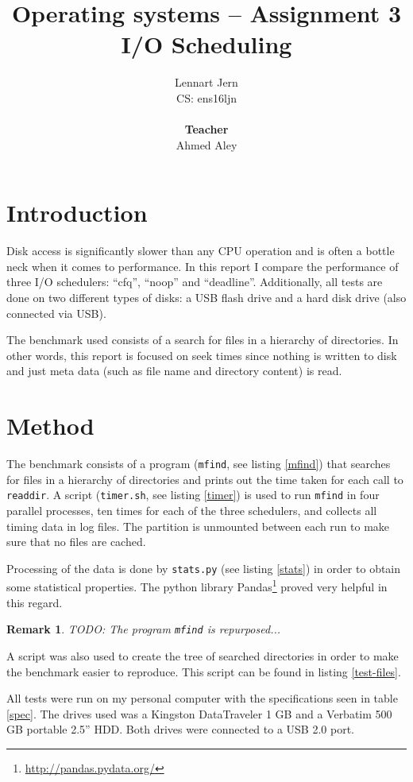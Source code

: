 \documentclass[12pt, a4paper]{article} %
\title{Operating systems -- Assignment 3\\I/O Scheduling}
\author{Lennart Jern\\
	CS: ens16ljn\\ \\ \textbf{Teacher}\\ Ahmed Aley}
\newtheorem{remark}{Remark}
\begin{document}
\maketitle

\newpage


\section{Introduction}

Disk access is significantly slower than any CPU operation and is often a bottle neck when it comes to performance.
In this report I compare the performance of three I/O schedulers: ``cfq'', ``noop'' and ``deadline''.
Additionally, all tests are done on two different types of disks: a USB flash drive and a hard disk drive (also connected via USB).

The benchmark used consists of a search for files in a hierarchy of directories.
In other words, this report is focused on seek times since nothing is written to disk and just meta data (such as file name and directory content) is read.

\section{Method}

The benchmark consists of a program (\texttt{mfind}, see listing \ref{mfind}) that searches for files in a hierarchy of directories and prints out the time taken for each call to \texttt{readdir}.
A script (\texttt{timer.sh}, see listing \ref{timer}) is used to run \texttt{mfind} in four parallel processes, ten times for each of the three schedulers, and collects all timing data in log files.
The partition is unmounted between each run to make sure that no files are cached.

Processing of the data is done by \texttt{stats.py} (see listing \ref{stats}) in order to obtain some statistical properties.
The python library Pandas\footnote{\url{http://pandas.pydata.org/}} proved very helpful in this regard.

\begin{remark}
	TODO: The program \texttt{mfind} is repurposed...
\end{remark}

A script was also used to create the tree of searched directories in order to make the benchmark easier to reproduce.
This script can be found in listing \ref{test-files}.

All tests were run on my personal computer with the specifications seen in table \ref{spec}.
The drives used was a Kingston DataTraveler 1 GB and a Verbatim 500 GB portable 2.5'' HDD.
Both drives were connected to a USB 2.0 port.
\end{document}
